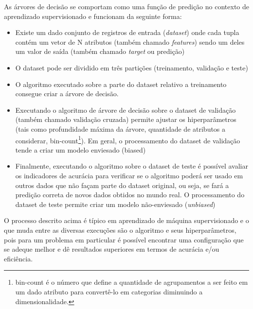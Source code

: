 \documentclass[12pt]{article}
\begin{document}
As árvores de decisão se comportam como uma função de predição no contexto de aprendizado supervisionado e funcionam da seguinte forma:
\begin{itemize}
\item Existe um dado conjunto de registros de entrada ({\it dataset}) onde cada tupla contém um vetor de N atributos (também chamado {\it features}) sendo um deles um valor de saída (também chamado {\it target} ou predição)

\item O dataset pode ser dividido em três partições (treinamento, validação e teste)

\item O algoritmo executado sobre a parte do dataset relativo a treinamento consegue criar a árvore de decisão.

\item Executando o algoritmo de árvore de decisão sobre o dataset de validação (também chamado validação cruzada) permite ajustar os hiperparâmetros (tais como profundidade máxima da árvore, quantidade de atributos a considerar, bin-count\footnote{bin-count é o número que define a quantidade de agrupamentos a ser feito em um dado atributo para convertê-lo em categorias diminuindo a dimensionalidade.}). Em geral, o processamento do dataset de validação tende a criar um modelo enviesado (biased)

\item Finalmente, executando o algoritmo sobre o dataset de teste é possível avaliar os indicadores de acurácia para verificar se o algoritmo poderá ser usado em outros dados que não façam parte do dataset original, ou seja, se fará a predição correta de novos dados obtidos no mundo real. O processamento do dataset de teste permite criar um modelo não-enviesado ({\it unbiased})
\end{itemize}
O processo descrito acima é típico em aprendizado de máquina supervisionado e o que muda entre as diversas execuções são o algoritmo e seus hiperparâmetros, pois para um problema em particular é possível encontrar uma configuração que se adeque melhor e dê resultados superiores em termos de acurácia e/ou eficiência.
\end{document}
